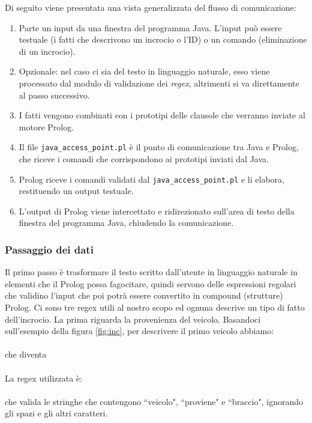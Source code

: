 Di seguito viene presentata una vista generalizzata del flusso di comunicazione:
\begin{enumerate}
	\item Parte un input da una finestra del programma Java. L'input può essere testuale (i fatti che descrivono un incrocio o l'ID) o un comando (eliminazione di un incrocio).
	\item Opzionale: nel caso ci sia del testo in linguaggio naturale, esso viene processato dal modulo di validazione dei \textit{regex}, altrimenti si va direttamente al passo successivo.
	\item I fatti vengono combinati con i prototipi delle clausole che verranno inviate al motore Prolog.
	\item Il file \texttt{java\_access\_point.pl} è il punto di comunicazione tra Java e Prolog, che riceve i comandi che corrispondono ai prototipi inviati dal Java.
	\item Prolog riceve i comandi validati dal \texttt{java\_access\_point.pl} e li elabora, restituendo un output testuale.
	\item L'output di Prolog viene intercettato e ridirezionato sull'area di testo della finestra del programma Java, chiudendo la comunicazione.
\end{enumerate}

\subsubsection{Passaggio dei dati}
\label{sssec:jap}
Il primo passo è trasformare il testo scritto dall'utente in linguaggio naturale in elementi che il Prolog possa fagocitare, quindi servono delle espressioni regolari che validino l'input che poi potrà essere convertito in compound (strutture) Prolog. Ci sono tre regex utili al nostro scopo ed ognuna descrive un tipo di fatto dell'incrocio.
La prima riguarda la provenienza del veicolo. Basandoci sull'esempio della figura \ref{fig:inc}, per descrivere il primo veicolo abbiamo:
\vspace{1mm} \\
\vspace{1mm}
\indent {} \\
\vspace{1mm}
che diventa \\
\vspace{1mm}
\indent {} \\
\vspace{1mm}
\noindent La regex utilizzata è: \\
\vspace{1mm}
\indent {} \\ \noindent che valida le stringhe che contengono ``veicolo", ``proviene" e ``braccio", ignorando gli spazi e gli altri caratteri.

